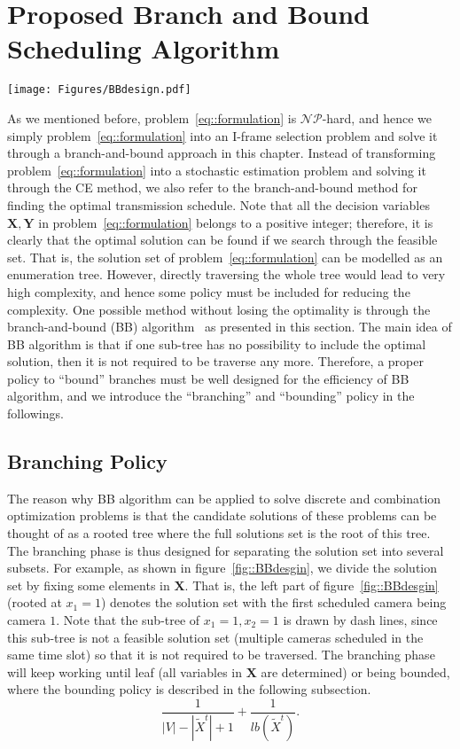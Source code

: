 \section{Proposed Branch and Bound Scheduling Algorithm}
\label{sec::bbAlgorithm}
\begin{figure*}
\begin{center}
\texttt{[image: Figures/BBdesign.pdf]}
\caption{\label{fig::BBdesgin}Enumeration tree of branch-and-bound algorithm}
\end{center}
\end{figure*}
As we mentioned before, problem~\eqref{eq::formulation} is $\mathcal{NP}$-hard, and hence we simply problem~\eqref{eq::formulation} into an I-frame selection problem and solve it through a branch-and-bound approach in this chapter.
Instead of transforming problem~\eqref{eq::formulation} into a stochastic estimation problem and solving it through the CE method, we also refer to the branch-and-bound method for finding the optimal transmission schedule.
Note that all the decision variables $\mathbf{X}, \mathbf{Y}$ in problem~\eqref{eq::formulation} belongs to a positive integer; therefore, it is clearly that the optimal solution can be found if we search through the feasible set.
That is, the solution set of problem~\eqref{eq::formulation} can be modelled as an enumeration tree.
However, directly traversing the whole tree would lead to very high complexity, and hence some policy must be included for reducing the complexity.
One possible method without losing the optimality is through the branch-and-bound (BB) algorithm~\cite{BB} as presented in this section.
The main idea of BB algorithm is that if one sub-tree has no possibility to include the optimal solution, then it is not required to be traverse any more.
Therefore, a proper policy to ``bound'' branches must be well designed for the efficiency of BB algorithm, and we introduce the ``branching'' and ``bounding'' policy in the followings.
%
\subsection{Branching Policy}
The reason why BB algorithm can be applied to solve discrete and combination optimization problems is that the candidate solutions of these problems can be thought of as a rooted tree where the full solutions set is the root of this tree.
The branching phase is thus designed for separating the solution set into several subsets.
For example, as shown in figure~\ref{fig::BBdesgin}, we divide the solution set by fixing some elements in $\mathbf{X}$.
That is, the left part of figure~\ref{fig::BBdesgin} (rooted at $x_1=1$) denotes the solution set with the first scheduled camera being camera $1$.
Note that the sub-tree of $x_1=1, x_2=1$ is drawn by dash lines, since this sub-tree is not a feasible solution set (multiple cameras scheduled in the same time slot) so that it is not required to be traversed.
The branching phase will keep working until leaf (all variables in $\mathbf{X}$ are determined) or being bounded, where the bounding policy is described in the following subsection.
\begin{equation}
\frac{1}{|V|-|\tilde{X}^t|+1}+\frac{1}{lb(\tilde{X}^t)}.
\end{equation}
%

